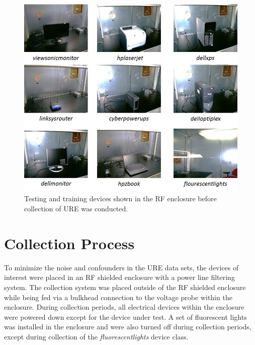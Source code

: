\begin{figure}[tb]
	\includegraphics[width=\textwidth]{./data_collection_results/device_pics.jpg}
	\centering
	\caption{Testing and training devices shown in the RF enclosure before collection of URE was conducted.}
	\label{fig:device_pics}
\end{figure}

\section[Collection Process]{Collection Process}

To minimize the noise and confounders in the URE data sets, the devices of interest were placed in an RF shielded enclosure with a power line filtering system.  The collection system was placed outside of the RF shielded enclosure while being fed via a bulkhead connection to the voltage probe within the enclosure.  During collection periods, all electrical devices within the enclosure were powered down except for the device under test.  A set of fluorescent lights was installed in the enclosure and were also turned off during collection periods, except during collection of the \textit{fluorescentlights} device class.  

